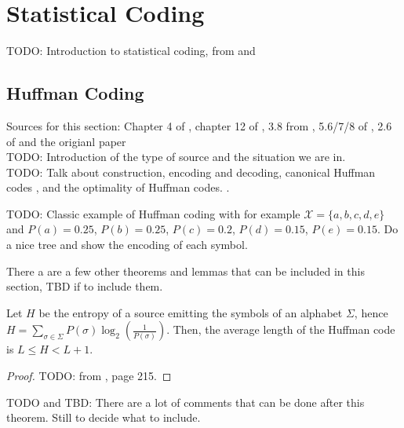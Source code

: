 \clearpage
\section{Statistical Coding} \label{sec:statistical_coding}

TODO: Introduction to statistical coding, from \cite{han2002mathematics} and \cite{ferragina2023pearls}

\subsection{Huffman Coding}

Sources for this section: Chapter 4 of \cite{sayood2002lossless}, chapter 12 of \cite{ferragina2023pearls}, 3.8 from \cite{han2002mathematics}, 5.6/7/8 of \cite{ElementsofInformationTheory}, 2.6 of \cite{navarro2016compact} and the origianl paper \cite{Huffman1952}\\


\noindent TODO: Introduction of the type of source and the situation we are in.\\



\noindent TODO: Talk about construction, encoding and decoding, canonical Huffman codes \cite{schwartz1964generating}, and the optimality of Huffman codes. \cite{ferragina2023pearls,sayood2002lossless}.

\begin{example}
    TODO: Classic example of Huffman coding with for example $\mathcal{X} = \{a,b,c,d,e\}$ and $P(a)= 0.25$, $P(b)=0.25$, $P(c)=0.2$, $P(d)=0.15$, $P(e)=0.15$. Do a nice tree and show the encoding of each symbol.
\end{example}
\noindent There a are a few other theorems and lemmas that can be included in this section, TBD if to include them.\\
\begin{theorem}
    Let $H$ be the entropy of a source emitting the symbols of an alphabet $\Sigma$, hence $H = \sum_{\sigma \in \Sigma} P(\sigma)\log_2\left(\frac{1}{P(\sigma)}\right)$. Then, the average length of the Huffman code is $L \leq H < L + 1$.
\end{theorem}
\begin{proof}
    TODO: from \cite{ferragina2023pearls}, page 215.
\end{proof}
TODO and TBD: There are a lot of comments that can be done after this theorem. Still to decide what to include.


